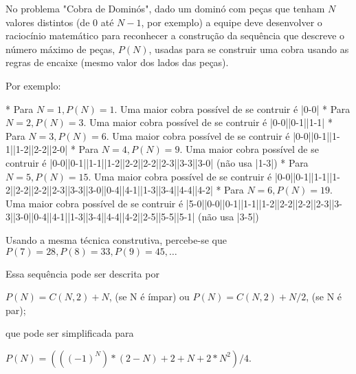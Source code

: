 % 

No problema "Cobra de Dominós", dado um dominó com peças que tenham $N$ valores distintos (de $0$ até $N-1$, por exemplo) a equipe deve desenvolver o raciocínio matemático para reconhecer a construção da sequência que descreve o número máximo de peças, $P(N)$, usadas para se construir uma cobra usando as regras de encaixe (mesmo valor dos lados das peças).

Por exemplo:

* Para $N = 1, P(N) = 1$.  Uma maior cobra possível de se contruir é |0-0|
* Para $N = 2, P(N) = 3$.  Uma maior cobra possível de se contruir é |0-0||0-1||1-1|
* Para $N = 3, P(N) = 6$.  Uma maior cobra possível de se contruir é |0-0||0-1||1-1||1-2||2-2||2-0|
* Para $N = 4, P(N) = 9$.  Uma maior cobra possível de se contruir é |0-0||0-1||1-1||1-2||2-2||2-2||2-3||3-3||3-0| (não usa |1-3|)
* Para $N = 5, P(N) = 15$. Uma maior cobra possível de se contruir é |0-0||0-1||1-1||1-2||2-2||2-2||2-3||3-3||3-0||0-4||4-1||1-3||3-4||4-4||4-2|
* Para $N = 6, P(N) = 19$. Uma maior cobra possível de se contruir é |5-0||0-0||0-1||1-1||1-2||2-2||2-2||2-3||3-3||3-0||0-4||4-1||1-3||3-4||4-4||4-2||2-5||5-5||5-1| (não usa |3-5|)

Usando a mesma técnica construtiva, percebe-se que $P(7) = 28, P(8) = 33, P(9) = 45, \ldots$

Essa sequência pode ser descrita por

$P(N) = C(N, 2) + N$, (se N é ímpar) ou $P(N) = C(N, 2) + N/2$, (se N é par);

que pode ser simplificada para

$P(N) = (( (-1)^N ) * (2 - N) + 2 + N + 2*N^2)/4$.
